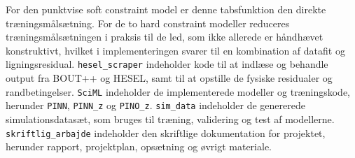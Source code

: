 For den punktvise soft constraint model er denne tabsfunktion den direkte træningsmålsætning. For de to hard constraint modeller reduceres træningsmålsætningen i praksis til de led, som ikke allerede er håndhævet konstruktivt, hvilket i implementeringen svarer til en kombination af datafit og ligningsresidual.
\texttt{hesel\_scraper} indeholder kode til at indlæse og behandle output fra BOUT++ og HESEL, samt til at opstille de fysiske residualer og randbetingelser.
\texttt{SciML} indeholder de implementerede modeller og træningskode, herunder \texttt{PINN}, \texttt{PINN\_z} og \texttt{PINO\_z}.
\texttt{sim\_data} indeholder de genererede simulationsdatasæt, som bruges til træning, validering og test af modellerne.
\texttt{skriftlig\_arbajde} indeholder den skriftlige dokumentation for projektet, herunder rapport, projektplan, opsætning og øvrigt materiale.